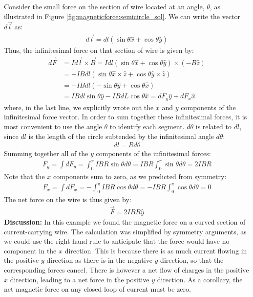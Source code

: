 \begin{example}
Consider the small force on the section of wire located at an angle, $\theta$, as illustrated in Figure \ref{fig:magneticforce:semicircle_sol}. We can write the vector $d\vec l$ as:
\begin{align*}
d\vec l = dl(\sin\theta\hat x + \cos\theta \hat y)
\end{align*}
Thus, the infinitesimal force on that section of wire is given by:
\begin{align*}
d\vec F &= I d\vec l \times \vec B = I dl(\sin\theta\hat x + \cos\theta \hat y)\times (-B\hat z)\\
&=-IBdl (\sin\theta\hat x \times \hat z + \cos\theta \hat y \times \hat z)\\
&=-IBdl (-\sin\theta \hat y + \cos\theta\hat x) \\
&= IBdl\sin\theta \hat y - IBdL\cos\theta \hat x = dF_y\hat y + dF_x \hat x
\end{align*} 
where, in the last line, we explicitly wrote out the $x$ and $y$ components of the infinitesimal force vector. In order to sum together these infinitesimal forces, it is most convenient to use the angle $\theta$ to identify each segment. $d\theta$ is related to $dl$, since $dl$ is the length of the circle subtended by the infinitesimal angle $d\theta$:
\begin{align*}
dl = Rd\theta
\end{align*}
Summing together all of the $y$ components of the infinitesimal forces:
\begin{align*}
F_y = \int dF_y = \int_0^\pi IBR\sin\theta d\theta=IBR \int_0^\pi\sin\theta d\theta=2IBR
\end{align*}
Note that the $x$ components sum to zero, as we predicted from symmetry:
\begin{align*}
F_x = \int dF_x = -\int_0^\pi IBR\cos\theta d\theta=-IBR \int_0^\pi\cos\theta d\theta=0
\end{align*}
The net force on the wire is thus given by:
\begin{align*}
\vec F = 2IBR\hat y
\end{align*}
\textbf{Discussion: }In this example we found the magnetic force on a curved section of current-carrying wire. The calculation was simplified by symmetry arguments, as we could use the right-hand rule to anticipate that the force would have no component in the $x$ direction. This is because there is as much current flowing in the positive $y$ direction as there is in the negative $y$ direction, so that the corresponding forces cancel. There is however a net flow of charges in the positive $x$ direction, leading to a net force in the positive $y$ direction. As a corollary, the net magnetic force on any closed loop of current must be zero.
\end{example}
